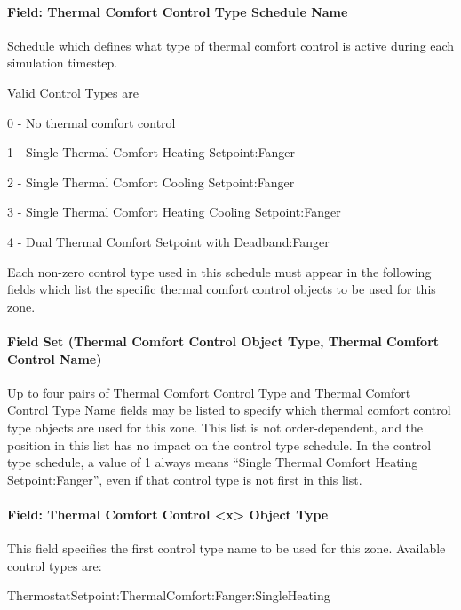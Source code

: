 \paragraph{Field: Thermal Comfort Control Type Schedule Name}\label{field-thermal-comfort-control-type-schedule-name}

Schedule which defines what type of thermal comfort control is active during each simulation timestep.

Valid Control Types are

0 - No thermal comfort control

1 - Single Thermal Comfort Heating Setpoint:Fanger

2 - Single Thermal Comfort Cooling Setpoint:Fanger

3 - Single Thermal Comfort Heating Cooling Setpoint:Fanger

4 - Dual Thermal Comfort Setpoint with Deadband:Fanger

Each non-zero control type used in this schedule must appear in the following fields which list the specific thermal comfort control objects to be used for this zone.

\paragraph{Field Set (Thermal Comfort Control Object Type, Thermal Comfort Control Name)}\label{field-set-thermal-comfort-control-object-type-thermal-comfort-control-name}

Up to four pairs of Thermal Comfort Control Type and Thermal Comfort Control Type Name fields may be listed to specify which thermal comfort control type objects are used for this zone. This list is not order-dependent, and the position in this list has no impact on the control type schedule. In the control type schedule, a value of 1 always means ``Single Thermal Comfort Heating Setpoint:Fanger'', even if that control type is not first in this list.

\paragraph{Field: Thermal Comfort Control \textless{}x\textgreater{} Object Type}\label{field-thermal-comfort-control-x-object-type}

This field specifies the first control type name to be used for this zone. Available control types are:

ThermostatSetpoint:ThermalComfort:Fanger:SingleHeating

